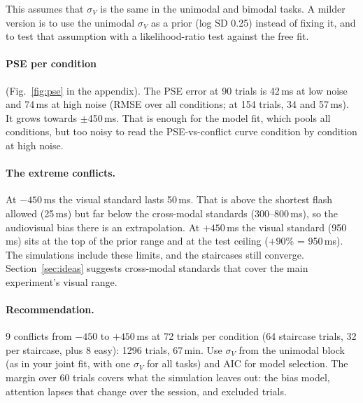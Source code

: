 \documentclass[11pt,a4paper]{article}
\begin{document}
This assumes that $\sigma_V$ is the same in the unimodal and bimodal tasks. A milder version is to use the unimodal $\sigma_V$ as a prior (log SD 0.25) instead of fixing it, and to test that assumption with a likelihood-ratio test against the free fit.

\paragraph{PSE per condition} (Fig.~\ref{fig:pse} in the appendix). The PSE error at 90 trials is 42\,ms at low noise and 74\,ms at high noise (RMSE over all conditions; at 154 trials, 34 and 57\,ms). It grows towards $\pm$450\,ms. That is enough for the model fit, which pools all conditions, but too noisy to read the PSE-vs-conflict curve condition by condition at high noise.

\paragraph{The extreme conflicts.} At $-450$\,ms the visual standard lasts 50\,ms. That is above the shortest flash allowed (25\,ms) but far below the cross-modal standards (300--800\,ms), so the audiovisual bias there is an extrapolation. At $+450$\,ms the visual standard (950\,ms) sits at the top of the prior range and at the test ceiling ($+90\%$ = 950\,ms). The simulations include these limits, and the staircases still converge. Section~\ref{sec:ideas} suggests cross-modal standards that cover the main experiment's visual range.

\paragraph{Recommendation.} 9 conflicts from $-450$ to $+450$\,ms at 72 trials per condition (64 staircase trials, 32 per staircase, plus 8 easy): 1296 trials, 67\,min. Use $\sigma_V$ from the unimodal block (as in your joint fit, with one $\sigma_V$ for all tasks) and AIC for model selection. The margin over 60 trials covers what the simulation leaves out: the bias model, attention lapses that change over the session, and excluded trials.
\end{document}
